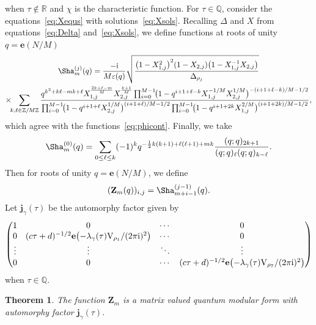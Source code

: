 \documentclass[pdftex]{sigma}
\numberwithin{equation}{section}
\newtheorem{Theorem}{Theorem}[section]
\def\BZ{\mathbb{Z}}
\def\BQ{\mathbb{Q}}
\def\BR{\mathbb{R}}
\def\e{\mathbf e}
\def\VC{\mathrm{VC}}
\def\WRT{\Sha}
\def\etaroots{\varepsilon}
\def\BZ{\mathbb Z}
\def\BQ{\mathbb Q}
\def\BR{\mathbb R}
\def\VC{\mathrm{V}}
\begin{document}
when $\tau\notin\BR$ and $\chi$ is the characteristic function. For $\tau\in\BQ$, consider the equations~\eqref{eq:Xequs} with solutions~\eqref{eq:Xsols}. Recalling $\Delta$ and $X$ from equations~\eqref{eq:Delta} and~\eqref{eq:Xsols}, we define functions at roots of unity $q=\e(N/M)$
\begin{gather}\label{eq:per.fun}
 \WRT^{(j)}_{m}(q) =\frac{-{\rm i}}{M\etaroots(q)}\sqrt{\frac{\bigl(1-X_{1,j}^2\bigr)^2(1-X_{2,j})\bigl(1-X_{1,j}^{-1}X_{2,j}\bigr)}{\Delta_{\rho_j}}}\\
 \times\!\!\sum_{k,\ell\in\BZ/M\BZ}
 \frac{q^{k^2+k\ell-mk+\ell}X_{1,j}^{\frac{2k+\ell-m}{M}}X_{2,j}^{\frac{k+1}{M}}  \prod_{i=0}^{M-1}\!\bigl(1-q^{i+1+\ell-k}X_{1,j}^{-1/M}X_{2,j}^{1/M}\bigr)^{-(i+1+\ell-k)/M-1/2}}{ \prod_{i=0}^{M-1}\!\bigl(1-q^{i+1+\ell}X_{2,j}^{1/M}\bigr)^{(i+1+\ell)/M-1/2}\prod_{i=0}^{M-1}\!\bigl(1-q^{i+1+2k}X_{1,j}^{2/M}\bigr)^{(i+1+2k)/M-1/2}} ,\nonumber
\end{gather}
which agree with the functions~\eqref{eq:phicont}. Finally, we take
\[
 \WRT^{(0)}_{m}(q)
  =
 \sum_{0\leq\ell\leq k}(-1)^{k}q^{-\frac{1}{2}k(k+1)+\ell(\ell+1)+mk}\frac{(q;q)_{2k+1}}{(q;q)_{\ell}(q;q)_{k-\ell}} .
\]
Then for roots of unity $q=\e(N/M)$, we define
\begin{gather*}%
 (\mathbf{Z}_m(q))_{i,j} =\WRT_{m+i-1}^{(j-1)}(q) .
\end{gather*}
Let $\mathbf{j}_{\gamma}(\tau)$ be the automorphy factor given by
\[
 \begin{pmatrix}
 1 & 0 & \cdots & 0\\
 0 & (c\tau+d)^{-1/2}\e\bigl(-\lambda_{\gamma}(\tau)\VC_{\rho_1}/(2\pi {\rm i})^2\bigr) & \cdots & 0\\
 \vdots & \vdots & \ddots & \vdots\\
 0 & 0 & \cdots & (c\tau+d)^{-1/2}\e\bigl(-\lambda_{\gamma}(\tau)\VC_{\rho_7}/(2\pi {\rm i})^2\bigr)
 \end{pmatrix}
\]
when $\tau\in\BQ$.

\begin{Theorem}\label{thm:zisqmod}
The function $\mathbf{Z}_{m}$ is a matrix valued quantum modular form with automorphy factor $\mathbf{j}_{\gamma}(\tau)$.
\end{Theorem}
\end{document}
